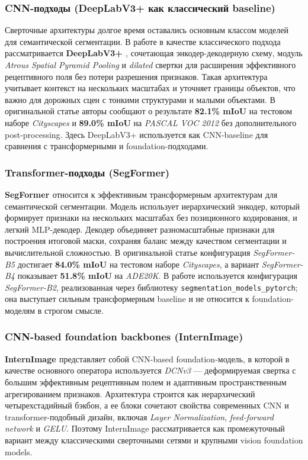 \documentclass[14pt,a4paper]{extarticle}
\begin{document}
\subsubsection{CNN-подходы (DeepLabV3+ как классический baseline)}
Сверточные архитектуры долгое время оставались основным классом моделей для семантической сегментации. В работе в качестве классического подхода рассматривается \textbf{DeepLabV3+ \cite{chen2018deeplabv3plus}}, сочетающая энкодер-декодерную схему, модуль \textit{Atrous Spatial Pyramid Pooling} и \textit{dilated} свертки для расширения эффективного рецептивного поля без потери разрешения признаков. Такая архитектура учитывает контекст на нескольких масштабах и уточняет границы объектов, что важно для дорожных сцен с тонкими структурами и малыми объектами. В оригинальной статье авторы сообщают о результате \textbf{82.1\% mIoU} на тестовом наборе \textit{Cityscapes} и \textbf{89.0\% mIoU} на \textit{PASCAL VOC 2012} без дополнительного post-processing. Здесь DeepLabV3+ используется как CNN-baseline для сравнения с трансформерными и foundation-подходами.

\subsubsection{Transformer-подходы (SegFormer)}
\textbf{SegFormer \cite{xie2021segformer} }относится к эффективным трансформерным архитектурам для семантической сегментации. Модель использует иерархический энкодер, который формирует признаки на нескольких масштабах без позиционного кодирования, и легкий MLP-декодер. Декодер объединяет разномасштабные признаки для построения итоговой маски, сохраняя баланс между качеством сегментации и вычислительной сложностью. В оригинальной статье конфигурация \textit{SegFormer-B5} достигает \textbf{84.0\% mIoU} на тестовом наборе \textit{Cityscapes}, а вариант \textit{SegFormer-B4} показывает \textbf{51.8\% mIoU} на \textit{ADE20K}. В работе используется конфигурация \textit{SegFormer-B2}, реализованная через библиотеку \texttt{segmentation\_models\_pytorch}; она выступает сильным трансформерным baseline и не относится к foundation-моделям в строгом смысле.

\subsubsection{CNN-based foundation backbones (InternImage)}
\textbf{InternImage \cite{wang2023internimage} }представляет собой CNN-based foundation-модель, в которой в качестве основного оператора используется \textit{DCNv3} --- деформируемая свертка с большим эффективным рецептивным полем и адаптивным пространственным агрегированием признаков. Архитектура строится как иерархический четырехстадийный бэкбон, а ее блоки сочетают свойства современных CNN и transformer-подобный дизайн, включая \textit{Layer Normalization}, \textit{feed-forward network} и \textit{GELU}. Поэтому InternImage рассматривается как промежуточный вариант между классическими сверточными сетями и крупными vision foundation models.
\end{document}
